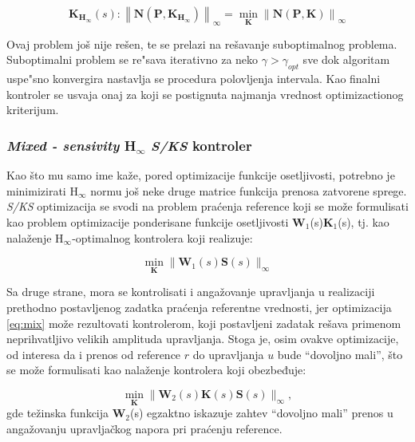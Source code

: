 \documentclass[a4paper,11pt]{article}
\theoremstyle{definition} \newtheorem{deff}{Definicija}[section]
\theoremstyle{definition} \newtheorem{prim}[deff]{Primer}
\theoremstyle{plain} \newtheorem{teor}[deff]{Teorema}
\begin{document}
			\begin{equation}
				\textbf{K}_{\textbf{H}_\infty} (s): \left\| \textbf{N}(\textbf{P},\textbf{K}_{\textbf{H}_\infty}) \right\|_\infty = \min_\textbf{K} \left\| \textbf{N}(\textbf{P},\textbf{K}) \right\|_\infty
			\end{equation}
			
			\noindent Ovaj problem još nije rešen, te se prelazi na rešavanje suboptimalnog problema. Suboptimalni problem se re"sava iterativno za neko $\gamma > \gamma_{opt}$ sve dok algoritam uspe"sno konvergira nastavlja se procedura polovljenja intervala. Kao finalni kontroler se usvaja onaj za koji se postignuta najmanja vrednost optimizactionog kriterijum.
			
			\clearpage
			\subsubsection{\textit{Mixed - sensivity} H$_\infty$ \textit{S/KS} kontroler }
			
			Kao što mu samo ime kaže, pored optimizacije funkcije osetljivosti, potrebno je minimizirati H$_\infty$ normu još neke druge matrice funkcija prenosa zatvorene sprege.\\
			
			\textit{S/KS} optimizacija se svodi na problem praćenja reference koji se može formulisati kao problem optimizacije ponderisane funkcije osetljivosti $\textbf{W}_1$(s)$\textbf{K}_1$(s), tj. kao
			nalaženje H$_\infty$-optimalnog kontrolera koji realizuje:
			
			\begin{equation}
				\min_\textbf{K} \|\textbf{W}_1(s)\textbf{S}(s)\|_\infty
				\label{eq:mix}
			\end{equation}
			
			\noindent Sa druge strane, mora se kontrolisati i angažovanje upravljanja u realizaciji
			prethodno postavljenog zadatka praćenja referentne vrednosti, jer
			optimizacija \eqref{eq:mix} može rezultovati kontrolerom, koji postavljeni zadatak rešava primenom neprihvatljivo velikih amplituda upravljanja. Stoga je, osim ovakve
			optimizacije, od interesa da i prenos od reference $r$ do upravljanja $u$ bude “dovoljno mali”, što se može formulisati kao nalaženje kontrolera koji obezbeđuje:
			
			\begin{equation}
				\min_\textbf{K} \|\textbf{W}_2(s)\textbf{K}(s)\textbf{S}(s)\|_\infty, 
				\label{eq:mix2}
			\end{equation}
			gde težinska funkcija $\textbf{W}_2$(s) egzaktno iskazuje zahtev “dovoljno mali” prenos
			u angažovanju upravljačkog napora pri praćenju reference. \\
			
\end{document}
